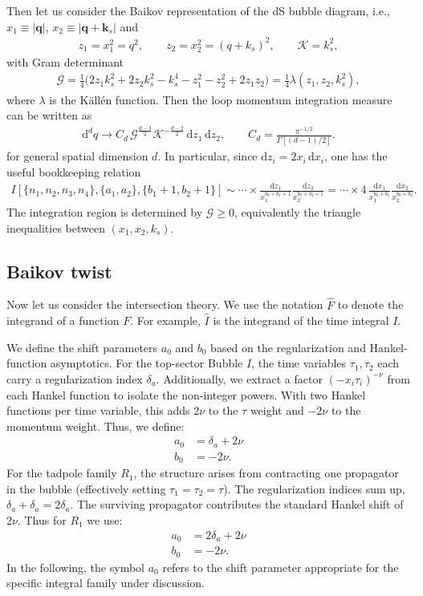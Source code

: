 \documentclass[a4paper]{article}
\def\di{{\mathrm{d}}}
\newcommand{\mG}{\mathcal{G}}
\newcommand{\mK}{\mathcal{K}}
\def\to{\rightarrow}
\begin{document}
Then let us consider the Baikov representation of the dS bubble diagram, i.e., $x_1\equiv|\bm q|$, $x_2\equiv|\bm q+\bm k_s|$ and
\begin{align}
	z_1=x_1^2=q^2,\qquad z_2=x_2^2=(q+k_s)^2,\qquad \mK=k_s^2,
\end{align}
with Gram determinant
\begin{align}
	\mG=\frac{1}{4}\Big(2 z_1 k_s^2+2 z_2 k_s^2-k_s^4-z_1^2-z_2^2+2 z_1 z_2\Big)
	=\frac{1}{4}\lambda(z_1,z_2,k_s^2),
\end{align}
where $\lambda$ is the K\"all\'en function. Then the loop momentum integration measure can be written as
\begin{align}
	\di^d q \to C_d\,\mG^{\frac{d-3}{2}}\mK^{-\frac{d-2}{2}}\,\di z_1\,\di z_2,
	\qquad C_{d} = \frac{\pi^{-1/2}}{\Gamma[(d-1)/2]}.
\end{align}
for general spatial dimension $d$. In particular, since $\di z_i=2x_i\,\di x_i$, one has the useful bookkeeping relation
\begin{align}
	I[\{n_1,n_2,n_3,n_4\},\{a_1,a_2\},\{b_1+1,b_2+1\}]
	\sim \cdots \times \frac{\di z_1}{x_1^{b_0+b_1+1}}\frac{\di z_2}{x_2^{b_0+b_2+1}}
	= \cdots \times 4\,\frac{\di x_1}{x_1^{b_0+b_1}}\frac{\di x_2}{x_2^{b_0+b_2}}.
\end{align}
The integration region is determined by $\mG\ge 0$, equivalently the triangle inequalities between $(x_1,x_2,k_s)$.



\subsection{Baikov twist}
\label{sec:dlog}
Now let us consider the intersection theory. We use the notation $\hat{F}$ to denote the integrand of a function $F$. For example, $\hat{I}$ is the integrand of the time integral $I$.

We define the shift parameters $a_0$ and $b_0$ based on the regularization and Hankel-function asymptotics. For the top-sector Bubble $I$, the time variables $\tau_1, \tau_2$ each carry a regularization index $\delta_a$. Additionally, we extract a factor $(-x_i \tau_i)^{-\nu}$ from each Hankel function to isolate the non-integer powers. With two Hankel functions per time variable, this adds $2\nu$ to the $\tau$ weight and $-2\nu$ to the momentum weight. Thus, we define:
\begin{align}
	a_0 &= \delta_a + 2\nu \\
	b_0 &= -2\nu.
\end{align}
For the tadpole family $R_1$, the structure arises from contracting one propagator in the bubble (effectively setting $\tau_1=\tau_2=\tau$). The regularization indices sum up, $\delta_a+\delta_a=2\delta_a$. The surviving propagator contributes the standard Hankel shift of $2\nu$. Thus for $R_1$ we use:
\begin{align}
	a_0 &= 2\delta_a + 2\nu\\
	b_0 &= -2\nu.
\end{align}
In the following, the symbol $a_0$ refers to the shift parameter appropriate for the specific integral family under discussion.
\end{document}
